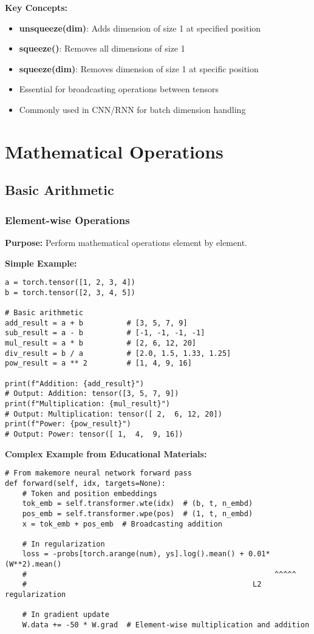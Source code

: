 \documentclass[11pt,a4paper]{book}
\begin{document}
\textbf{Key Concepts:}
\begin{itemize}
    \item \textbf{unsqueeze(dim)}: Adds dimension of size 1 at specified position
    \item \textbf{squeeze()}: Removes all dimensions of size 1
    \item \textbf{squeeze(dim)}: Removes dimension of size 1 at specific position
    \item Essential for broadcasting operations between tensors
    \item Commonly used in CNN/RNN for batch dimension handling
\end{itemize}

\chapter{Mathematical Operations}

\section{Basic Arithmetic}

\subsection{Element-wise Operations}

\textbf{Purpose:} Perform mathematical operations element by element.

\textbf{Simple Example:}
\begin{verbatim}
a = torch.tensor([1, 2, 3, 4])
b = torch.tensor([2, 3, 4, 5])

# Basic arithmetic
add_result = a + b          # [3, 5, 7, 9]
sub_result = a - b          # [-1, -1, -1, -1]
mul_result = a * b          # [2, 6, 12, 20]
div_result = b / a          # [2.0, 1.5, 1.33, 1.25]
pow_result = a ** 2         # [1, 4, 9, 16]

print(f"Addition: {add_result}")
# Output: Addition: tensor([3, 5, 7, 9])
print(f"Multiplication: {mul_result}")
# Output: Multiplication: tensor([ 2,  6, 12, 20])
print(f"Power: {pow_result}")
# Output: Power: tensor([ 1,  4,  9, 16])
\end{verbatim}

\textbf{Complex Example from Educational Materials:}
\begin{verbatim}
# From makemore neural network forward pass
def forward(self, idx, targets=None):
    # Token and position embeddings
    tok_emb = self.transformer.wte(idx)  # (b, t, n_embd)
    pos_emb = self.transformer.wpe(pos)  # (1, t, n_embd)
    x = tok_emb + pos_emb  # Broadcasting addition
    
    # In regularization
    loss = -probs[torch.arange(num), ys].log().mean() + 0.01*(W**2).mean()
    #                                                         ^^^^^
    #                                                    L2 regularization
    
    # In gradient update
    W.data += -50 * W.grad  # Element-wise multiplication and addition
\end{verbatim}
\end{document}
